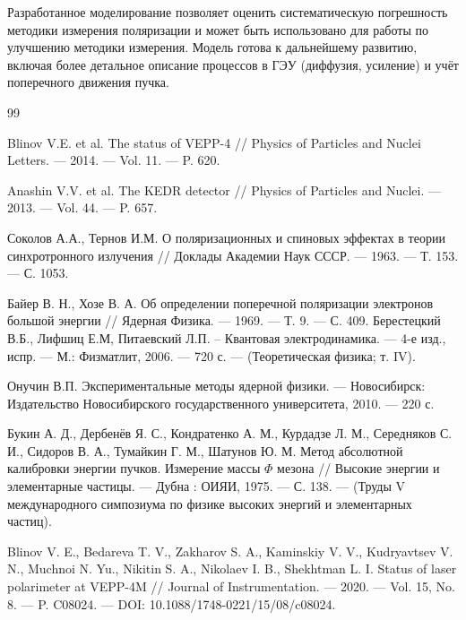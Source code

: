 \documentclass[14pt, a4paper]{extreport}
\begin{document}
Разработанное моделирование позволяет оценить систематическую погрешность методики измерения поляризации и может быть использовано для работы по улучшению методики измерения. Модель готова к дальнейшему развитию, включая более детальное описание процессов в ГЭУ (диффузия, усиление) и учёт поперечного движения пучка.
\newpage
\renewcommand{\bibname}{Список использованной литературы}
\begin{thebibliography}{99}

 Blinov V.E. et al. The status of VEPP-4 // Physics of Particles and Nuclei Letters. — 2014. — Vol. 11. — P. 620.

 Anashin V.V. et al. The KEDR detector // Physics of Particles and Nuclei. — 2013. — Vol. 44. — P. 657.

 Соколов А.А., Тернов И.М. О поляризационных и спиновых эффектах в теории синхротронного излучения // Доклады Академии Наук СССР. — 1963. — Т. 153. — С. 1053.

 Байер В. Н., Хозе В. А. Об определении поперечной поляризации электронов
большой энергии // Ядерная Физика. — 1969. — Т. 9. — С. 409.
 Берестецкий В.Б., Лифшиц Е.М, Питаевский Л.П. -- Квантовая электродинамика. — 4-е изд., испр. — М.: Физматлит, 2006. — 720 с. — (Теоретическая физика; т. IV).

 Онучин В.П. Экспериментальные методы ядерной физики. — Новосибирск: Издательство Новосибирского государственного университета, 2010. — 220 с.


 Букин А. Д., Дербенёв Я. С., Кондратенко А. М., Курдадзе Л. М.,
Середняков С. И., Сидоров В. А., Тумайкин Г. М., Шатунов Ю. М. Метод
абсолютной калибровки энергии пучков. Измерение массы $\Phi$ мезона //
Высокие энергии и элементарные частицы. — Дубна : ОИЯИ, 1975. — С. 138.
— (Труды V международного симпозиума по физике высоких энергий и
элементарных частиц).

 Blinov V. E., Bedareva T. V., Zakharov S. A., Kaminskiy V. V.,
Kudryavtsev V. N., Muchnoi N. Yu., Nikitin S. A., Nikolaev I. B.,
Shekhtman L. I. Status of laser polarimeter at VEPP-4M // Journal of
Instrumentation. — 2020. — Vol. 15, No. 8. — P. C08024. — DOI:
10.1088/1748-0221/15/08/c08024.
\end{thebibliography}
\end{document}
